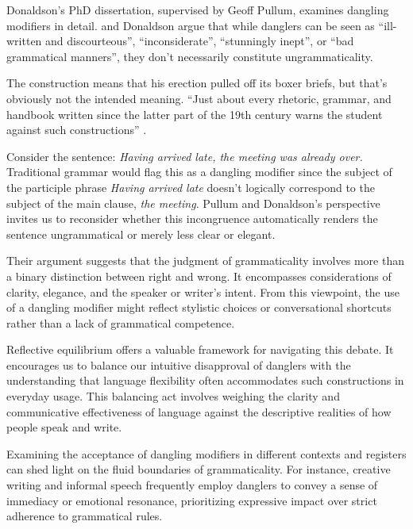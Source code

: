 Donaldson's PhD dissertation, supervised by Geoff Pullum, examines dangling modifiers in detail. \citet{LanguageLog218,LanguageLog1938,LanguageLog1973,LanguageLog2153} and Donaldson argue that while danglers can be seen as \enquote{ill-written and discourteous}, \enquote{inconsiderate}, \enquote{stunningly inept}, or \enquote{bad grammatical manners}, they don't necessarily constitute ungrammaticality.


The construction means that his erection pulled off its boxer briefs, but that's obviously not the intended meaning. \enquote{Just about every rhetoric, grammar, and handbook written since the latter part of the 19th century warns the student against such constructions} \citep[314]{Gilman1989}.

Consider the sentence: \textit{Having arrived late, the meeting was already over.} Traditional grammar would flag this as a dangling modifier since the subject of the participle phrase \textit{Having arrived late} doesn't logically correspond to the subject of the main clause, \textit{the meeting}. Pullum and Donaldson's perspective invites us to reconsider whether this incongruence automatically renders the sentence ungrammatical or merely less clear or elegant.

Their argument suggests that the judgment of grammaticality involves more than a binary distinction between right and wrong. It encompasses considerations of clarity, elegance, and the speaker or writer's intent. From this viewpoint, the use of a dangling modifier might reflect stylistic choices or conversational shortcuts rather than a lack of grammatical competence.

Reflective equilibrium offers a valuable framework for navigating this debate. It encourages us to balance our intuitive disapproval of danglers with the understanding that language flexibility often accommodates such constructions in everyday usage. This balancing act involves weighing the clarity and communicative effectiveness of language against the descriptive realities of how people speak and write.

Examining the acceptance of dangling modifiers in different contexts and registers can shed light on the fluid boundaries of grammaticality. For instance, creative writing and informal speech frequently employ danglers to convey a sense of immediacy or emotional resonance, prioritizing expressive impact over strict adherence to grammatical rules.

